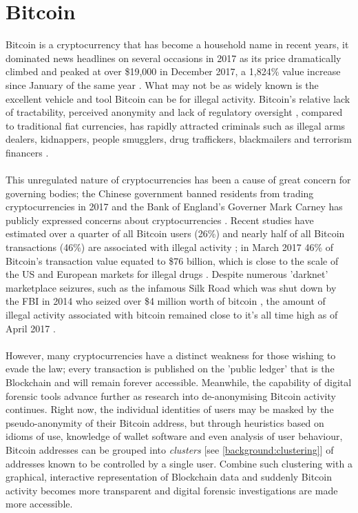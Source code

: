 \section{Bitcoin}
Bitcoin is a cryptocurrency that has become a household name in recent years, it dominated news headlines on several occasions in 2017 as its price dramatically climbed and peaked at over \$19,000 in December 2017, a 1,824\% value increase since January of the same year \cite{RefWorks:doc:5cfb6adce4b03a90bd6e557d}. What may not be as widely known is the excellent vehicle and tool Bitcoin can be for illegal activity. Bitcoin's relative lack of tractability, perceived anonymity and lack of regulatory oversight \cite{RefWorks:doc:5cfb837fe4b0d23f20773924}, compared to traditional fiat currencies, has rapidly attracted criminals such as illegal arms dealers, kidnappers, people smugglers, drug traffickers, blackmailers and terrorism financers \cite{RefWorks:doc:5cfb79e2e4b0132e0223fff6} \cite{RefWorks:doc:5c49e7c4e4b0d339f6625a91}.
\\\\
This unregulated nature of cryptocurrencies has been a cause of great concern for governing bodies; the Chinese government banned residents from trading cryptocurrencies in 2017 and the Bank of England's Governer Mark Carney has publicly expressed concerns about cryptocurrencies \cite{RefWorks:doc:5cfbc8fee4b05850fa02e710}. 
Recent studies have estimated over a quarter of all Bitcoin users (26\%) and nearly half of all Bitcoin transactions (46\%) are associated with illegal activity \cite{RefWorks:doc:5cfbc8fee4b05850fa02e710}; in March 2017 46\% of Bitcoin's transaction value equated to \$76 billion, which is close to the scale of the US and European markets for illegal drugs \cite{RefWorks:doc:5cfbc8fee4b05850fa02e710}. Despite numerous 'darknet' marketplace seizures, such as the infamous Silk Road which was shut down by the FBI in 2014 who seized over \$4 million worth of bitcoin \cite{RefWorks:doc:5cfbc8fee4b05850fa02e710}, the amount of illegal activity associated with bitcoin remained close to it's all time high as of April 2017 \cite{RefWorks:doc:5cfbc8fee4b05850fa02e710}. 
\\\\
However, many cryptocurrencies have a distinct weakness for those wishing to evade the law; every transaction is published on the 'public ledger' that is the Blockchain and will remain forever accessible. Meanwhile, the capability of digital forensic tools advance further as research into de-anonymising Bitcoin activity continues. Right now, the individual identities of users may be masked by the pseudo-anonymity of their Bitcoin address, but through heuristics based on idioms of use, knowledge of wallet software and even analysis of user behaviour, Bitcoin addresses can be grouped into \textit{clusters} [see \ref{background:clustering}] of addresses known to be controlled by a single user. Combine such clustering with a graphical, interactive representation of Blockchain data and suddenly Bitcoin activity becomes more transparent and digital forensic investigations are made more accessible. 

